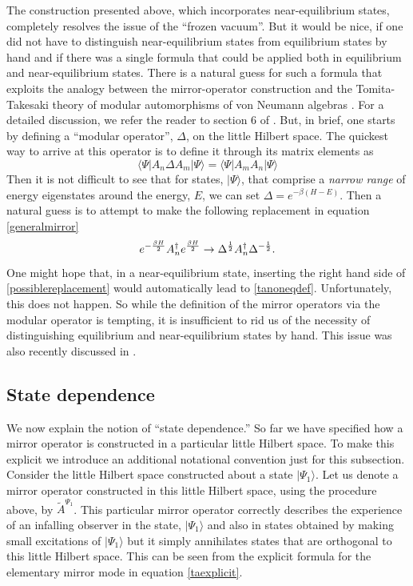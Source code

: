 \documentclass[12pt]{article}
\newcommand{\cop}[1]{#1}
\newcommand{\al}{\cop{A}} %
\def\tal{\widetilde{\al}} %
\newcommand{\be}{\begin{equation}}
\newcommand{\ee}{\end{equation}}
\begin{document}
The construction presented above, which incorporates near-equilibrium states,  completely resolves the issue of the ``frozen vacuum''. But it would be nice, if one did not have to
 distinguish near-equilibrium states from equilibrium states by hand and if there was a single formula that could be applied both in equilibrium and near-equilibrium states. There is a natural guess for such a formula that exploits
the analogy between the mirror-operator construction and the Tomita-Takesaki theory of modular automorphisms of von Neumann algebras \cite{takesaki2006tomita}. For a detailed discussion, we refer the reader to section 6 of \cite{Papadodimas:2013jku}. But, in brief, one starts by defining a ``modular operator'', $\Delta$, on the little Hilbert space. The quickest way to arrive at this operator is to define it through its matrix elements as
\be
\label{deltadef}
\langle \Psi | A_n \Delta A_m |\Psi \rangle = \langle \Psi | A_m A_n |\Psi \rangle
\ee
Then it is not difficult to see that for states, $|\Psi \rangle$, that comprise a {\em narrow range} of energy eigenstates around the energy, $E$, we can set $\Delta = e^{-\beta (H - E)}$. Then a natural guess is to attempt to make the following replacement in equation \eqref{generalmirror}
\be
\label{possiblereplacement}
 e^{-{\beta H \over 2}} \al_n^{\dagger} e^{\beta H \over 2} \rightarrow \Delta^{1 \over 2} \al_n^{\dagger} \Delta^{-{1 \over 2}}.
\ee
One might hope that, in a near-equilibrium state,  inserting the right hand side of \eqref{possiblereplacement} would automatically lead to  \eqref{tanoneqdef}. Unfortunately, this does not happen. So while the definition of the mirror operators via the modular operator is tempting, it is insufficient to rid us of the necessity of distinguishing equilibrium and near-equilibrium states by hand. This issue was also recently discussed in \cite{Jafferis:2020ora}.











\subsection{State dependence \label{secorigstate}}
We now explain the notion of ``state dependence.'' So far we have specified how a mirror operator is constructed in a particular little Hilbert space.  To make this explicit we introduce an additional notational convention just for this subsection. Consider the little Hilbert space constructed about a state $|\Psi_1 \rangle$. Let us denote a mirror operator constructed in this little Hilbert space, using the procedure above,  by  $\tal^{\Psi_1}$.   This particular mirror operator correctly describes the experience of an infalling observer in the state, $|\Psi_1 \rangle$ and also in states obtained by making small excitations of $|\Psi_1 \rangle$ but it  simply annihilates states that are orthogonal to this little Hilbert space. This can be seen from the explicit formula for the elementary mirror mode in equation \eqref{taexplicit}.
\end{document}
